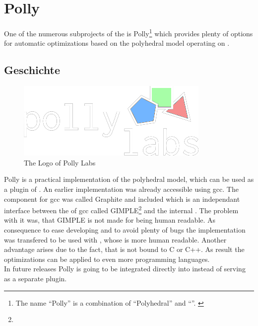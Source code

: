 \chapter{Polly}
One of the numerous subprojects of the \llvm is Polly\footnote{The name \enquote{Polly} is a combination of \enquote{Polyhedral} and \enquote{\llvm}. \cite{PollyGrosser}} which provides plenty of options for automatic optimizations based on the polyhedral model operating on \llvmir.

\section{Geschichte}
\begin{figure}
    \caption[The logo of Polly Labs]{The Logo of Polly Labs \cite{PollyLabsLogo}}
    \includegraphics[width=.5\textwidth]{gfx/pollylabs.png}
\end{figure}
Polly is a practical implementation of the polyhedral model, which can be used as a plugin of \llvm.
An earlier implementation was already accessible using gcc.
The component for gcc was called Graphite and included \pcp which is an independant interface between the \ir of gcc called GIMPLE\footnote{} and the internal \ir \gpoly . \cite{GrosserGraphite, gccGimple, gccGraphite} 
The problem with it was, that GIMPLE is not made for being human readable.
As consequence to ease developing and to avoid plenty of bugs the implementation was transfered to be used with \llvm, whose \ir is more human readable.
Another advantage arises due to the fact, that \llvm is not bound to C or C++.
As result the optimizations can be applied to even more programming languages. \\
In future releases Polly is going to be integrated directly into \llvm instead of serving as a separate plugin.

